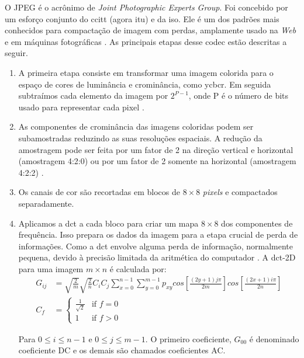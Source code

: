 O JPEG é o acrônimo de \textit{Joint Photographic Experts Group}. Foi concebido por um esforço conjunto do \gls{ccitt} (agora \gls{itu}) e da \gls{iso}. Ele é um dos padrões mais conhecidos para compactação de imagem com perdas, amplamente usado na \textit{Web} e em máquinas fotográficas \cite{sayood2017introduction}. 
As principais etapas desse \acrshort{codec} estão descritas a seguir. 
\begin{enumerate}
	\item A primeira etapa consiste em transformar uma imagem colorida para o espaço de cores de luminância e crominância, como \acrshort{ycbcr}. Em seguida subtraímos cada elemento da imagem por $2^{P-1}$, onde P é o número de bits usado para representar cada pixel \cite{sayood2017introduction}. 
	\item As componentes de crominância das imagens coloridas podem ser subamostradas reduzindo as suas resoluções espaciais. A redução da amostragem pode ser feita por um fator de 2 na direção vertical e horizontal (amostragem 4:2:0) ou por um fator de 2 somente na horizontal (amostragem 4:2:2) \cite{salomon2007data}. 
	\item Os canais de cor são recortadas em blocos de $8 \times 8$ \textit{pixels} e compactados separadamente. 
	\item Aplicamos a \gls{dct} a cada bloco para criar um mapa $8 \times 8$ dos componentes de frequência.
	Isso prepara os dados da imagem para a etapa crucial de perda de informações. Como a \acrshort{dct} envolve alguma perda de informação, normalmente pequena, devido à precisão limitada da aritmética do computador \cite{salomon2007data}. A \acrshort{dct}-2D para uma imagem $m \times n$ é calculada por:
	\begin{equation}
	\begin{aligned}
	G_{ij} &= \sqrt{\frac{2}{m}}\sqrt{\frac{2}{n}}C_iC_j\sum_{x=0}^{n-1}\sum_{y=0}^{m-1}p_{xy} cos\left [ \frac{(2y+1)j\pi}{2m} \right] cos\left [ \frac{(2x+1)i\pi}{2n} \right] \\
	C_f &=  \left\{
	\begin{array}{ll}
	\frac{1}{\sqrt{2}}  & \mbox{if } f = 0 \\
	1 & \mbox{if } f > 0
	\end{array}
	\right.
	\end{aligned}
	\end{equation}
	
	Para $0 \leq i \leq n - 1$ e $0 \leq j \leq m - 1$. O primeiro coeficiente, $G_{00}$ é denominado coeficiente DC e os demais são chamados coeficientes AC. 
	

\end{enumerate}
